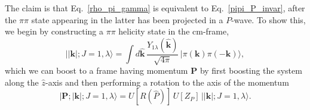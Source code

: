 {The claim is that Eq.~\ref{rho_pi_gamma} is equivalent to Eq.~\ref{pipi_P_invar}, after the $\pi\pi$ state appearing in the latter has been projected in a \mbox{$P$-wave}. To show this, we begin by constructing a $\pi\pi$ helicity state in the cm-frame,
\begin{equation}
\big| |\textbf{k}|; J=1, \lambda \big\rangle = \int \! d\hat{\mathbf{k}} \, \frac{Y_{1\lambda}(\hat{\mathbf{k}})}{\sqrt{4\pi}}\, \big| \pi(\textbf{k}) \pi(-\textbf{k})\big\rangle,
\end{equation}
which we can boost to a frame having momentum $\textbf{P}$ by first boosting the system along the $\hat{z}$-axis and then performing a rotation to the axis of the momentum
\begin{equation}
\big| \textbf{P}; |\textbf{k}|; J=1, \lambda \big\rangle = U[R(\hat{P})]\, U[Z_P]\,  \big| |\textbf{k}|; J=1, \lambda \big\rangle.
\end{equation}

}
